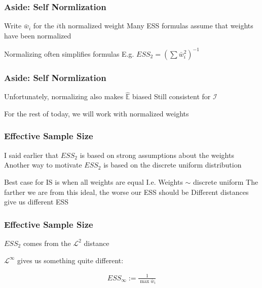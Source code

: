 \documentclass[14pt]{beamer}
\newcommand{\bE}{\mathbb{E}}
\newcommand{\I}{\mathcal{I}}
\newcommand{\esst}{ESS_2}
\newcommand{\essi}{ESS_\infty}
\newcommand{\eh}{\hat{\bE}}
\begin{document}
\begin{frame}
    \frametitle{Aside: Self Normlization}

    \begin{outline}
        \1 Write $\bar{w}_i$ for the $i$th normalized weight
            \2 Many ESS formulas assume that weights have been normalized \newline
        
        \1 Normalizing often simplifies formulas
        \1 E.g. $\esst = (\sum \bar{w}_i^2)^{-1}$

    \end{outline}
\end{frame}

\begin{frame}
    \frametitle{Aside: Self Normlization}

    \begin{outline}
        \1 Unfortunately, normalizing also makes $\eh$ biased
            \2 Still consistent for $\I$ \newline
        
        \1 For the rest of today, we will work with normalized weights
    \end{outline}
\end{frame}


\begin{frame}
    \frametitle{Effective Sample Size}

    \begin{outline}
        \1 I said earlier that $\esst$ is based on strong assumptions about the weights
        \1 Another way to motivate $\esst$ is based on the discrete uniform distribution \newline
        
        \1 Best case for IS is when all weights are equal
            \2 I.e. Weights $\sim$ discrete uniform
        \1 The farther we are from this ideal, the worse our ESS should be
        \1 Different distances give us different ESS
    \end{outline}
    

\end{frame}


\begin{frame}
    \frametitle{Effective Sample Size}

    \begin{outline}
        \1 $\esst$ comes from the $\mathcal{L}^2$ distance \newline
        
        \1 $\mathcal{L}^\infty$ gives us something quite different:        
    \end{outline}
    \begin{gather*}
        \essi := \frac{1}{\max \bar{w}_i}
    \end{gather*}
    

\end{frame}
\end{document}
